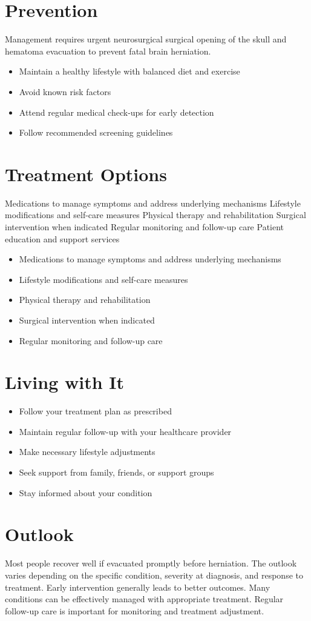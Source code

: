 \section{Prevention}
Management requires urgent neurosurgical surgical opening of the skull and hematoma evacuation to prevent fatal brain herniation.

\begin{itemize}[noitemsep]
  \item Maintain a healthy lifestyle with balanced diet and exercise
  \item Avoid known risk factors
  \item Attend regular medical check-ups for early detection
  \item Follow recommended screening guidelines
\end{itemize}
\section{Treatment Options}
Medications to manage symptoms and address underlying mechanisms Lifestyle modifications and self-care measures Physical therapy and rehabilitation Surgical intervention when indicated Regular monitoring and follow-up care Patient education and support services

\begin{itemize}[noitemsep]
  \item Medications to manage symptoms and address underlying mechanisms
  \item Lifestyle modifications and self-care measures
  \item Physical therapy and rehabilitation
  \item Surgical intervention when indicated
  \item Regular monitoring and follow-up care
\end{itemize}
\section{Living with It}
\begin{itemize}[noitemsep]
  \item Follow your treatment plan as prescribed
  \item Maintain regular follow-up with your healthcare provider
  \item Make necessary lifestyle adjustments
  \item Seek support from family, friends, or support groups
  \item Stay informed about your condition
\end{itemize}
\section{Outlook}
Most people recover well if evacuated promptly before herniation. The outlook varies depending on the specific condition, severity at diagnosis, and response to treatment. Early intervention generally leads to better outcomes. Many conditions can be effectively managed with appropriate treatment. Regular follow-up care is important for monitoring and treatment adjustment.
